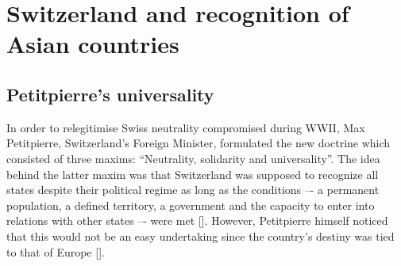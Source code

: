 \documentclass[a4paper]{article}
\begin{document}
\section{Switzerland and recognition of Asian countries}
\subsection{Petitpierre's universality}
In order to relegitimise Swiss neutrality compromised during WWII, Max Petitpierre, Switzerland’s Foreign Minister, formulated the new doctrine which consisted of three maxims: “Neutrality, solidarity and universality”. The idea behind the latter maxim was that Switzerland was supposed to recognize all states despite their political regime as long as the conditions –- a permanent population, a defined territory, a government and the capacity to enter into relations with other states –- were met []. However, Petitpierre himself noticed that this would not be an easy undertaking since the country’s destiny was tied to that of Europe []. 
\end{document}
